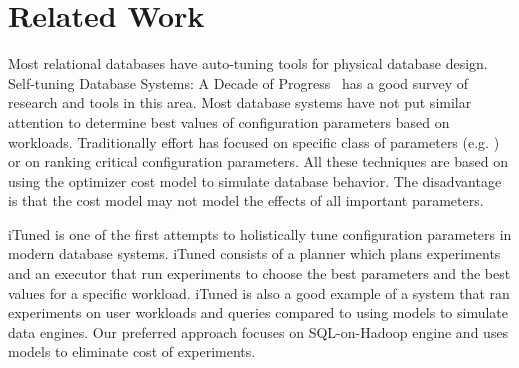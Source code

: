 \section{Related Work}
\label{sec:relatedwork}
Most relational databases have auto-tuning tools for physical database design. 
Self-tuning Database Systems: A Decade of Progress~\cite{Chaudhuri}
 has a good survey of research and tools in this area. Most database systems have 
not put similar attention to determine best values of configuration parameters 
based on workloads. Traditionally effort has focused on specific class of parameters 
(e.g.\cite{Storm} ) or on ranking
critical configuration parameters\cite{DebnathLM08}. All these techniques
are based on using the optimizer cost model to simulate database behavior. The disadvantage is
that the cost model may not model the effects of all important parameters.

iTuned\cite{Duan} is one of the first attempts to holistically 
tune configuration parameters in modern database systems. iTuned consists of a planner
which plans experiments and an executor that run experiments to choose the best parameters
and the best values for a specific workload. iTuned is also a good example of a system that
ran experiments on user workloads and queries compared to using models to simulate data engines.
Our preferred approach focuses on SQL-on-Hadoop engine and uses models to eliminate cost of experiments.
 
